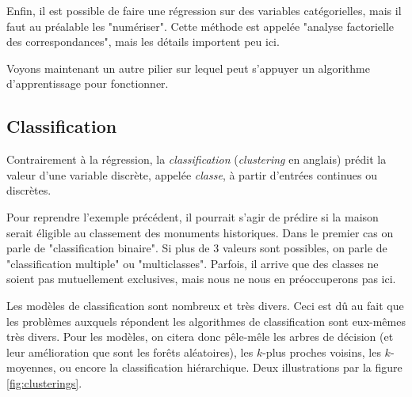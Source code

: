 Enfin, il est possible de faire une régression sur des variables catégorielles, mais il faut au préalable les "numériser". Cette méthode est appelée "analyse factorielle des correspondances", mais les détails importent peu ici.

Voyons maintenant un autre pilier sur lequel peut s'appuyer un algorithme d'apprentissage pour fonctionner.

\subsection{Classification} 
Contrairement à la régression, la \emph{classification} (\emph{clustering} en anglais) prédit la valeur d'une variable discrète, appelée \emph{classe}, à partir d'entrées continues ou discrètes.

Pour reprendre l'exemple précédent, il pourrait s'agir de prédire si la maison serait éligible au classement des monuments historiques. Dans le premier cas on parle de "classification binaire". Si plus de 3 valeurs sont possibles, on parle de "classification multiple" ou "multiclasses". Parfois, il arrive que des classes ne soient pas mutuellement exclusives, mais nous ne nous en préoccuperons pas ici.

Les modèles de classification sont nombreux et très divers. Ceci est dû au fait que les problèmes auxquels répondent les algorithmes de classification sont eux-mêmes très divers. Pour les modèles, on citera donc pêle-mêle les arbres de décision (et leur amélioration que sont les forêts aléatoires), les \(k\)-plus proches voisins,  les \(k\)-moyennes, ou encore la classification hiérarchique. Deux illustrations par la figure \ref{fig:clusterings}.

